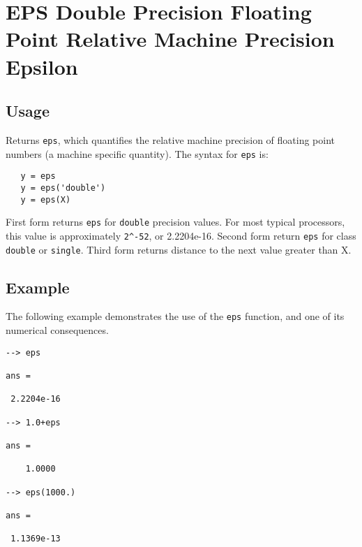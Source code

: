 \section{EPS Double Precision Floating Point Relative Machine Precision Epsilon}

\subsection{Usage}

Returns \verb|eps|, which quantifies the relative machine precision
of floating point numbers (a machine specific quantity).  The syntax
for \verb|eps| is:
\begin{verbatim}
   y = eps
   y = eps('double')
   y = eps(X)
\end{verbatim}
First form returns \verb|eps| for \verb|double| precision values. For most
typical processors, this value is approximately \verb|2^-52|, or 2.2204e-16.
Second form return \verb|eps| for class \verb|double| or \verb|single|.
Third form returns distance to the next value greater than X.
\subsection{Example}

The following example demonstrates the use of the \verb|eps| function,
and one of its numerical consequences.
\begin{verbatim}
--> eps

ans = 

 2.2204e-16 

--> 1.0+eps

ans = 

    1.0000 

--> eps(1000.)

ans = 

 1.1369e-13 
\end{verbatim}
